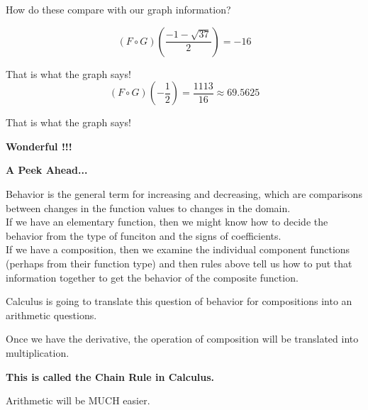 \documentclass{ximera}
\begin{document}
How do these compare with our graph information? \




\[
(F \circ G)\left( \frac{-1 - \sqrt{37}}{2} \right) = -16
\]

That is what the graph says! \\






\[
(F \circ G)\left( -\frac{1}{2} \right) = \frac{1113}{16} \approx 69.5625
\]

That is what the graph says! \\


\begin{center}
\textbf{\textcolor{red!80!black}{Wonderful !!!}}
\end{center}










\textbf{\textcolor{red!70!black}{A Peek Ahead...}}


Behavior is the general term for increasing and decreasing, which are comparisons between changes in the function values to changes in the domain. \\


If we have an elementary function, then we might know how to decide the behavior from the type of funciton and the signs of coefficients. \\

If we have a composition, then we examine the individual component functions (perhaps from their function type) and then rules above tell us how to put that information together to get the behavior of the composite function.


Calculus is going to translate this question of behavior for compositions into an arithmetic questions.

Once we have the derivative, the operation of composition will be translated into multiplication.

\begin{center}

\textbf{\textcolor{red!70!black}{This is called the Chain Rule in Calculus.}}

\end{center}


Arithmetic will be MUCH easier.
\end{document}
